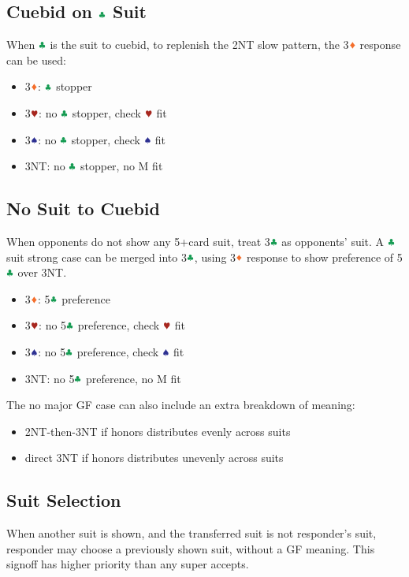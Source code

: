 \documentclass{article}
\newcommand*{\ccc}{\textcolor{ForestGreen}{\clubsuit}}
\newcommand*{\ddd}{\textcolor{Orange}{\vardiamondsuit}}
\newcommand*{\hhh}{\textcolor{Mahogany}{\varheartsuit}}
\newcommand*{\sss}{\textcolor{Blue}{\spadesuit}}
\begin{document}
\begin{multicols}{2}
\subsection{Cuebid on $\ccc$ Suit}
When $\ccc$ is the suit to cuebid, to replenish the 2NT slow pattern, the 3$\ddd$ response can be used:
\begin{itemize}
    \setlength\itemsep{-0.2em}
    \item 3$\ddd$: $\ccc$ stopper
    \item 3$\hhh$: no $\ccc$ stopper, check $\hhh$ fit
    \item 3$\sss$: no $\ccc$ stopper, check $\sss$ fit
    \item 3NT: no $\ccc$ stopper, no M fit
\end{itemize}

\subsection{No Suit to Cuebid}
When opponents do not show any 5+card suit, treat 3$\ccc$ as opponents' suit. A $\ccc$ suit strong case can be merged into 3$\ccc$, using 3$\ddd$ response to show preference of 5$\ccc$ over 3NT.
\begin{itemize}
    \setlength\itemsep{-0.2em}
    \item 3$\ddd$: 5$\ccc$ preference
    \item 3$\hhh$: no 5$\ccc$ preference, check $\hhh$ fit
    \item 3$\sss$: no 5$\ccc$ preference, check $\sss$ fit
    \item 3NT: no 5$\ccc$ preference, no M fit
\end{itemize}

\noindent The no major GF case can also include an extra breakdown of meaning:
\begin{itemize}
    \setlength\itemsep{-0.2em}
    \item 2NT-then-3NT if honors distributes evenly across suits
    \item direct 3NT if honors distributes unevenly across suits
\end{itemize}

\subsection{Suit Selection}
When another suit is shown, and the transferred suit is not responder's suit, responder may choose a previously shown suit, without a GF meaning. This signoff has higher priority than any super accepts.


\end{multicols}
\end{document}
